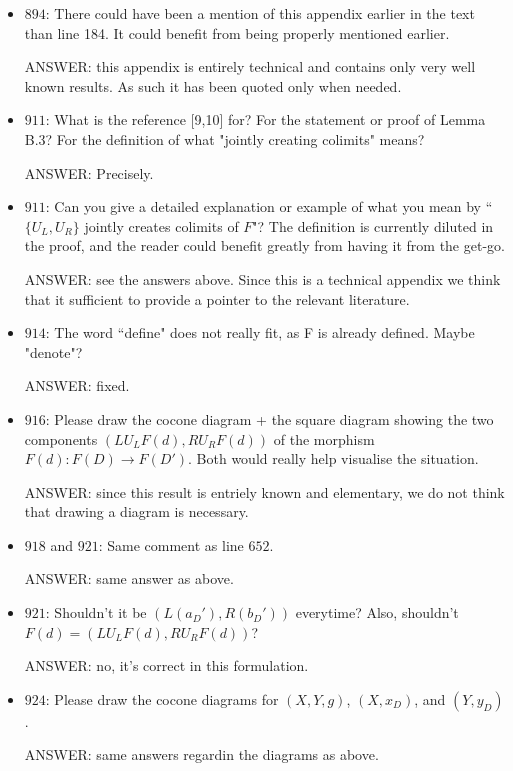 \documentclass[english,11pt,a4paper]{article}
\begin{document}
\begin{itemize}
\item $894$: There could have been a mention of this appendix earlier in the text than line 184. It could benefit from being properly mentioned earlier.

ANSWER: this appendix is entirely technical and contains only very well known results. As such it has been quoted only when needed.


\item $911$: What is the reference [9,10] for? For the statement or proof of Lemma B.3? For the definition of what "jointly creating colimits" means?

ANSWER: Precisely.

\item $911$: Can you give a detailed explanation or example of what you mean by ``$\{U_L, U_R\}$ jointly creates colimits of $F$"? The definition is currently diluted in the proof, and the reader could benefit greatly from having it from the get-go.

ANSWER: see the answers above. Since this is a technical appendix we think that it sufficient to provide a pointer to the relevant literature.

\item $914$: The word ``define" does not really fit, as F is already defined. Maybe "denote"?

ANSWER: fixed.

\item $916$: Please draw the cocone diagram + the square diagram showing the two components $(LU_LF(d),RU_RF(d))$ of the morphism $F(d):F(D) \to F(D')$. Both would really help visualise the situation.

ANSWER: since this result is entriely known and elementary, we do not think that drawing a diagram is necessary.


\item $918$ and $921$: Same comment as line $652$.

ANSWER: same answer as above.

\item $921$: Shouldn't it be $(L(a_D'),R(b_D'))$ everytime? Also, shouldn't $F(d) = (LU_LF(d),RU_RF(d))$?


ANSWER:  no, it's correct in this formulation.

\item $924$: Please draw the cocone diagrams for $(X,Y,g)$, $(X,{x_D})$, and $(Y,{y_D})$.

ANSWER: same answers regardin the diagrams as above.


\end{itemize}
\end{document}
